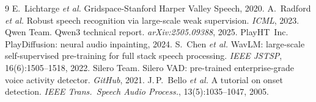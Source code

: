 \documentclass[9pt,twocolumn]{article}
\begin{document}
{\footnotesize\setlength{\bibsep}{2pt}
\begin{thebibliography}{9}
E.~Lichtarge \textit{et al.}
Gridspace-Stanford Harper Valley Speech, 2020.
A.~Radford \textit{et al.}
Robust speech recognition via large-scale weak supervision.
\textit{ICML}, 2023.
Qwen Team.
Qwen3 technical report. \textit{arXiv:2505.09388}, 2025.
PlayHT~Inc.
PlayDiffusion: neural audio inpainting, 2024.
S.~Chen \textit{et al.}
WavLM: large-scale self-supervised pre-training for full stack
speech processing. \textit{IEEE JSTSP}, 16(6):1505--1518, 2022.
Silero Team.
Silero VAD: pre-trained enterprise-grade voice activity detector.
\textit{GitHub}, 2021.
J.\,P.~Bello \textit{et al.}
A tutorial on onset detection.
\textit{IEEE Trans.\ Speech Audio Process.}, 13(5):1035--1047, 2005.
\end{thebibliography}
}
\end{document}
